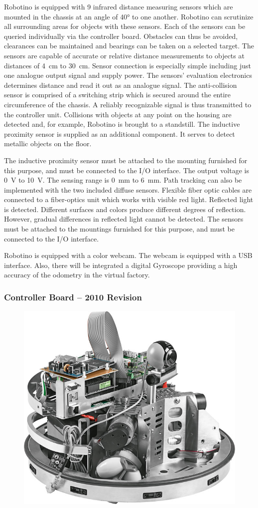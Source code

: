 \documentclass[12pt,twoside]{article}
\begin{document}
\begin{appendix}
Robotino is equipped with 9 infrared distance measuring sensors which
are mounted in the chassis at an angle of \ang{40} to one
another. Robotino can scrutinize all surrounding areas for objects
with these sensors.  Each of the sensors can be queried individually
via the controller board. Obstacles can thus be avoided, clearances
can be maintained and bearings can be taken on a selected target. The
sensors are capable of accurate or relative distance measurements to
objects at distances of \SI{4}{\centi\metre} to
\SI{30}{\centi\metre}. Sensor connection is especially simple
including just one analogue output signal and supply power. The
sensors' evaluation electronics determines distance and read it out as
an analogue signal.  The anti-collision sensor is comprised of a
switching strip which is secured around the entire circumference of
the chassis. A reliably recognizable signal is thus transmitted to the
controller unit.  Collisions with objects at any point on the housing
are detected and, for example, Robotino is brought to a
standstill. The inductive proximity sensor is supplied as an
additional component. It serves to detect metallic objects on the
floor.

The inductive proximity sensor must be attached to the mounting
furnished for this purpose, and must be connected to the I/O
interface.  The output voltage is \SI{0}{\volt} to \SI{10}{\volt}. The
sensing range is \SI{0}{\milli\metre} to \SI{6}{\milli\metre}. Path
tracking can also be implemented with the two included diffuse
sensors.  Flexible fiber optic cables are connected to a fiber-optics
unit which works with visible red light. Reflected light is
detected. Different surfaces and colors produce different degrees of
reflection. However, gradual differences in reflected light cannot be
detected. The sensors must be attached to the mountings furnished for
this purpose, and must be connected to the I/O interface.

Robotino is equipped with a color webcam. The webcam is equipped with
a USB interface. Also, there will be integrated a digital Gyroscope
providing a high accuracy of the odometry in the virtual factory.

\subsubsection{Controller Board – 2010 Revision}

\begin{figure}[h]
\centering
\includegraphics[width=.5\textwidth]{RobotinoOpen.jpg}
\label{apx:fig:robotinoopen}
\end{figure}



\end{appendix}
\end{document}

